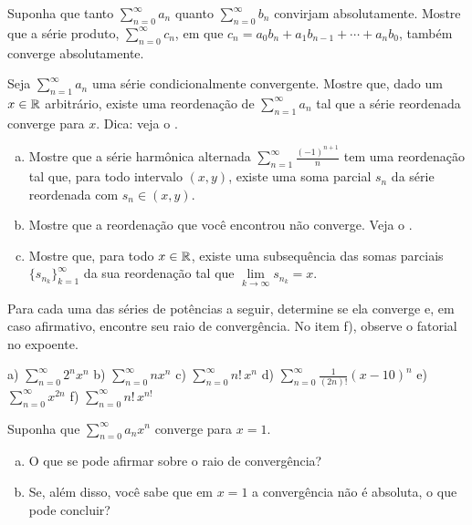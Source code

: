 \begin{exercise}
Suponha que tanto $\sum_{n=0}^\infty a_n$ quanto $\sum_{n=0}^\infty b_n$
convirjam absolutamente.
Mostre que a série produto, $\sum_{n=0}^\infty c_n$, em que
$c_n = a_0 b_n + a_1 b_{n-1} + \cdots + a_n b_0$, também converge absolutamente.
\end{exercise}

\begin{exercise}[Desafiador] \label{exercise:seriesconvergestoanything}
Seja $\sum_{n=1}^\infty a_n$ uma série condicionalmente convergente.
Mostre que, dado um $x \in {\mathbb{R}}$ arbitrário,
existe uma reordenação de $\sum_{n=1}^\infty a_n$
tal que a série reordenada converge para $x$.
Dica: veja o .
\end{exercise}

\begin{exercise}
\pagebreak[2]
\leavevmode
\begin{enumerate}[a)]
\item
Mostre que a série harmônica alternada $\sum_{n=1}^\infty \frac{{(-1)}^{n+1}}{n}$
tem uma reordenação
tal que, para todo intervalo $(x,y)$, existe uma soma parcial $s_n$
da série reordenada com $s_n \in (x,y)$.
\item
Mostre que a reordenação que você encontrou não converge.
Veja o .
\item
Mostre que, para todo $x \in {\mathbb{R}}$, existe uma subsequência das
somas parciais $\{ s_{n_k} \}_{k=1}^\infty$ da sua reordenação tal que
$\lim\limits_{k\to\infty} s_{n_k} = x$.
\end{enumerate}
\end{exercise}

\begin{exercise}
Para cada uma das séries de potências a seguir, determine se ela converge
e, em caso afirmativo, encontre seu raio de convergência.
No item f), observe o fatorial no expoente.

\medskip

\noindent
a)
$\displaystyle \sum_{n=0}^\infty 2^n x^n$
\qquad
b) $\displaystyle \sum_{n=0}^\infty n x^n$
\qquad 
c) 
$\displaystyle \sum_{n=0}^\infty n! \, x^n$
\qquad
d) $\displaystyle \sum_{n=0}^\infty \frac{1}{(2n)!} {(x-10)}^n$
\qquad
e) $\displaystyle \sum_{n=0}^\infty x^{2n}$
\qquad
f) $\displaystyle \sum_{n=0}^\infty n! \, x^{n!}$
\end{exercise}

\begin{exercise}
Suponha que $\sum_{n=0}^\infty a_n x^n$ converge para $x=1$.
\begin{enumerate}[a)]
\item
O que se pode afirmar sobre o raio de convergência?
\item
Se, além disso, você sabe que em $x=1$ a convergência não é absoluta,
o que pode concluir?
\end{enumerate}
\end{exercise}

